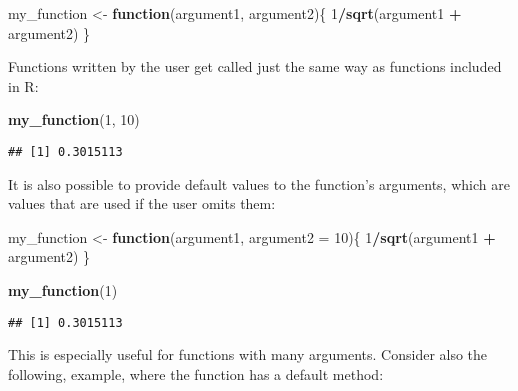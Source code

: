 \documentclass[
]{article}
\newenvironment{Shaded}{\begin{snugshade}}{\end{snugshade}}
\newcommand{\ControlFlowTok}[1]{\textcolor[rgb]{0.13,0.29,0.53}{\textbf{#1}}}
\newcommand{\DataTypeTok}[1]{\textcolor[rgb]{0.13,0.29,0.53}{#1}}
\newcommand{\DecValTok}[1]{\textcolor[rgb]{0.00,0.00,0.81}{#1}}
\newcommand{\KeywordTok}[1]{\textcolor[rgb]{0.13,0.29,0.53}{\textbf{#1}}}
\newcommand{\NormalTok}[1]{#1}
\newcommand{\OperatorTok}[1]{\textcolor[rgb]{0.81,0.36,0.00}{\textbf{#1}}}
\newcommand{\StringTok}[1]{\textcolor[rgb]{0.31,0.60,0.02}{#1}}
\begin{document}
\begin{Shaded}
\begin{Highlighting}[]
\NormalTok{my\_function \textless{}{-}}\StringTok{ }\ControlFlowTok{function}\NormalTok{(argument1, argument2)\{}
  \DecValTok{1}\OperatorTok{/}\KeywordTok{sqrt}\NormalTok{(argument1 }\OperatorTok{+}\StringTok{ }\NormalTok{argument2)}
\NormalTok{\}}
\end{Highlighting}
\end{Shaded}

Functions written by the user get called just the same way as functions included in R:

\begin{Shaded}
\begin{Highlighting}[]
\KeywordTok{my\_function}\NormalTok{(}\DecValTok{1}\NormalTok{, }\DecValTok{10}\NormalTok{)}
\end{Highlighting}
\end{Shaded}

\begin{verbatim}
## [1] 0.3015113
\end{verbatim}

It is also possible to provide default values to the function's arguments, which are values that are used
if the user omits them:

\begin{Shaded}
\begin{Highlighting}[]
\NormalTok{my\_function \textless{}{-}}\StringTok{ }\ControlFlowTok{function}\NormalTok{(argument1, }\DataTypeTok{argument2 =} \DecValTok{10}\NormalTok{)\{}
\DecValTok{1}\OperatorTok{/}\KeywordTok{sqrt}\NormalTok{(argument1 }\OperatorTok{+}\StringTok{ }\NormalTok{argument2)}
\NormalTok{\}}
\end{Highlighting}
\end{Shaded}

\begin{Shaded}
\begin{Highlighting}[]
\KeywordTok{my\_function}\NormalTok{(}\DecValTok{1}\NormalTok{)}
\end{Highlighting}
\end{Shaded}

\begin{verbatim}
## [1] 0.3015113
\end{verbatim}

This is especially useful for functions with many arguments. Consider also the following, example,
where the function has a default method:
\end{document}
